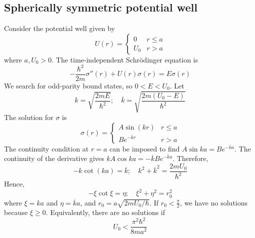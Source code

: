 \subsection{Spherically symmetric potential well}
Consider the potential well given by
\[
	U(r) = \begin{cases}
		0   & r \leq a \\
		U_0 & r > a
	\end{cases}
\]
where \( a, U_0 > 0 \).
The time-independent Schr\"odinger equation is
\[
	-\frac{\hbar^2}{2m} \sigma''(r) + U(r) \sigma(r) = E \sigma(r)
\]
We search for odd-parity bound states, so \( 0 < E < U_0 \).
Let
\[
	k = \sqrt{\frac{2mE}{\hbar^2}};\quad \overline k = \sqrt{\frac{2m(U_0 - E)}{\hbar^2}}
\]
The solution for \( \sigma \) is
\[
	\sigma(r) = \begin{cases}
		A \sin(kr)           & r \leq a \\
		B e^{-\overline k r} & r > a
	\end{cases}
\]
The continuity condition at \( r = a \) can be imposed to find \( A \sin ka = B e^{-\overline k a} \).
The continuity of the derivative gives \( kA \cos ka = -\overline k B e^{-\overline k a} \).
Therefore,
\[
	-k \cot(ka) = \overline k;\quad k^2 + \overline k^2 = \frac{2mU_0}{\hbar^2}
\]
Hence,
\[
	-\xi \cot \xi = \eta; \quad \xi^2 + \eta^2 = r_0^2
\]
where \( \xi = ka \) and \( \eta = \overline k a \), and \( r_0 = a\sqrt{2mU_0/\hbar} \).
If \( r_0 < \frac{\pi}{2} \), we have no solutions because \( \xi \geq 0 \).
Equivalently, there are no solutions if
\[
	U_0 < \frac{\pi^2 \hbar^2}{8ma^2}
\]
